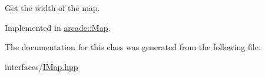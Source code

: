 Get the width of the map. 



Implemented in \hyperlink{classarcade_1_1_map_a55d2afd98fcc471f5075a99357673700}{arcade\-::\-Map}.



The documentation for this class was generated from the following file\-:\begin{DoxyCompactItemize}
\item 
interfaces/\hyperlink{_i_map_8hpp}{I\-Map.\-hpp}\end{DoxyCompactItemize}
